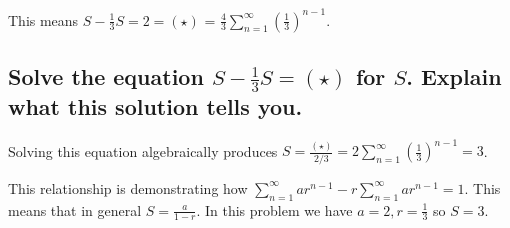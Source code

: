 This means $S - \frac{1}{3}S = 2 = (\star)$ = $\frac{4}{3} \sum\limits_{n=1}^\infty (\frac{1}{3})^{n-1}$.

\subsection{Solve the equation $S - \frac{1}{3}S = (\star)$ for $S$. Explain what this solution tells you.}
Solving this equation algebraically produces $S = \frac{(\star)}{2 / 3} = 2\sum\limits_{n=1}^\infty (\frac{1}{3})^{n-1} = 3$.

This relationship is demonstrating how $\sum\limits_{n=1}^\infty ar^{n-1} - r\sum\limits_{n=1}^\infty ar^{n-1} = 1$. This means that in general $S = \frac{a}{1-r}$. In this problem we have $a=2, r = \frac{1}{3}$ so $S = 3$.
